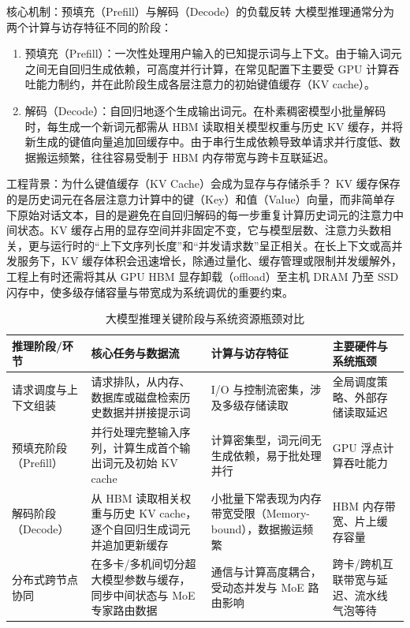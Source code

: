 \documentclass[UTF8,a4paper,11pt,fontset=fandol]{ctexart}
\begin{document}
\begin{importantbox}{核心机制：预填充（Prefill）与解码（Decode）的负载反转}
大模型推理通常分为两个计算与访存特征不同的阶段：
\begin{enumerate}
\item 预填充（Prefill）：一次性处理用户输入的已知提示词与上下文。由于输入词元之间无自回归生成依赖，可高度并行计算，在常见配置下主要受 GPU 计算吞吐能力制约，并在此阶段生成各层注意力的初始键值缓存（KV cache）。
\item 解码（Decode）：自回归地逐个生成输出词元。在朴素稠密模型小批量解码时，每生成一个新词元都需从 HBM 读取相关模型权重与历史 KV 缓存，并将新生成的键值向量追加回缓存中。由于串行生成依赖导致单请求并行度低、数据搬运频繁，往往容易受制于 HBM 内存带宽与跨卡互联延迟。
\end{enumerate}
\end{importantbox}
\begin{knowledgebox}{工程背景：为什么键值缓存（KV Cache）会成为显存与存储杀手？}
KV 缓存保存的是历史词元在各层注意力计算中的键（Key）和值（Value）向量，而非简单存下原始对话文本，目的是避免在自回归解码的每一步重复计算历史词元的注意力中间状态。KV 缓存占用的显存空间并非固定不变，它与模型层数、注意力头数相关，更与运行时的“上下文序列长度”和“并发请求数”呈正相关。在长上下文或高并发服务下，KV 缓存体积会迅速增长，除通过量化、缓存管理或限制并发缓解外，工程上有时还需将其从 GPU HBM 显存卸载（offload）至主机 DRAM 乃至 SSD 闪存中，使多级存储容量与带宽成为系统调优的重要约束。
\end{knowledgebox}
\begin{table}[H]\centering\small
\caption{大模型推理关键阶段与系统资源瓶颈对比}
\begin{tabular}{>{\raggedright\arraybackslash}p{\dimexpr(\linewidth-8\tabcolsep)/4\relax}>{\raggedright\arraybackslash}p{\dimexpr(\linewidth-8\tabcolsep)/4\relax}>{\raggedright\arraybackslash}p{\dimexpr(\linewidth-8\tabcolsep)/4\relax}>{\raggedright\arraybackslash}p{\dimexpr(\linewidth-8\tabcolsep)/4\relax}}
\toprule
推理阶段/环节 & 核心任务与数据流 & 计算与访存特征 & 主要硬件与系统瓶颈\\\midrule
请求调度与上下文组装 & 请求排队，从内存、数据库或磁盘检索历史数据并拼接提示词 & I/O 与控制流密集，涉及多级存储读取 & 全局调度策略、外部存储读取延迟\\[4pt]
预填充阶段（Prefill） & 并行处理完整输入序列，计算生成首个输出词元及初始 KV cache & 计算密集型，词元间无生成依赖，易于批处理并行 & GPU 浮点计算吞吐能力\\[4pt]
解码阶段（Decode） & 从 HBM 读取相关权重与历史 KV cache，逐个自回归生成词元并追加更新缓存 & 小批量下常表现为内存带宽受限（Memory-bound），数据搬运频繁 & HBM 内存带宽、片上缓存容量\\[4pt]
分布式跨节点协同 & 在多卡/多机间切分超大模型参数与缓存，同步中间状态与 MoE 专家路由数据 & 通信与计算高度耦合，受动态并发与 MoE 路由影响 & 跨卡/跨机互联带宽与延迟、流水线气泡等待\\[4pt]
\bottomrule\end{tabular}\end{table}
\end{document}
